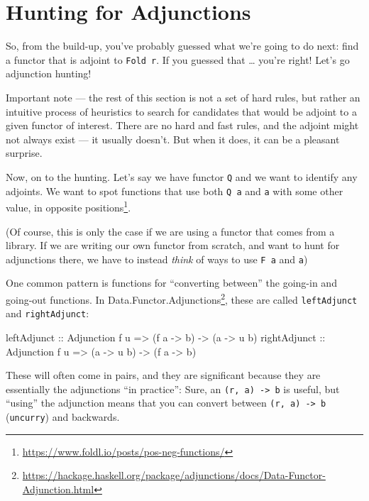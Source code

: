 \documentclass[]{article}
\newenvironment{Shaded}{}{}
\newcommand{\DataTypeTok}[1]{\textcolor[rgb]{0.56,0.13,0.00}{#1}}
\newcommand{\NormalTok}[1]{#1}
\newcommand{\OtherTok}[1]{\textcolor[rgb]{0.00,0.44,0.13}{#1}}
\renewcommand{\href}[2]{#2\footnote{\url{#1}}}
\begin{document}
\hypertarget{hunting-for-adjunctions}{%
\section{Hunting for Adjunctions}\label{hunting-for-adjunctions}}

So, from the build-up, you've probably guessed what we're going to do next: find
a functor that is adjoint to \texttt{Fold\ r}. If you guessed that \ldots{}
you're right! Let's go adjunction hunting!

Important note --- the rest of this section is not a set of hard rules, but
rather an intuitive process of heuristics to search for candidates that would be
adjoint to a given functor of interest. There are no hard and fast rules, and
the adjoint might not always exist --- it usually doesn't. But when it does, it
can be a pleasant surprise.

Now, on to the hunting. Let's say we have functor \texttt{Q} and we want to
identify any adjoints. We want to spot functions that use both \texttt{Q\ a} and
\texttt{a} with some other value, in
\href{https://www.foldl.io/posts/pos-neg-functions/}{opposite positions}.

(Of course, this is only the case if we are using a functor that comes from a
library. If we are writing our own functor from scratch, and want to hunt for
adjunctions there, we have to instead \emph{think} of ways to use \texttt{F\ a}
and \texttt{a})

One common pattern is functions for ``converting between'' the going-in and
going-out functions. In
\href{https://hackage.haskell.org/package/adjunctions/docs/Data-Functor-Adjunction.html}{Data.Functor.Adjunctions},
these are called \texttt{leftAdjunct} and \texttt{rightAdjunct}:

\begin{Shaded}
\begin{Highlighting}[]
\OtherTok{leftAdjunct  ::} \DataTypeTok{Adjunction}\NormalTok{ f u }\OtherTok{=>}\NormalTok{ (f a }\OtherTok{{-}>}\NormalTok{ b) }\OtherTok{{-}>}\NormalTok{ (a }\OtherTok{{-}>}\NormalTok{ u b)}
\OtherTok{rightAdjunct ::} \DataTypeTok{Adjunction}\NormalTok{ f u }\OtherTok{=>}\NormalTok{ (a }\OtherTok{{-}>}\NormalTok{ u b) }\OtherTok{{-}>}\NormalTok{ (f a }\OtherTok{{-}>}\NormalTok{ b)}
\end{Highlighting}
\end{Shaded}

These will often come in pairs, and they are significant because they are
essentially the adjunctions ``in practice'': Sure, an
\texttt{(r,\ a)\ -\textgreater{}\ b} is useful, but ``using'' the adjunction
means that you can convert between \texttt{(r,\ a)\ -\textgreater{}\ b}
(\texttt{uncurry}) and backwards.
\end{document}

